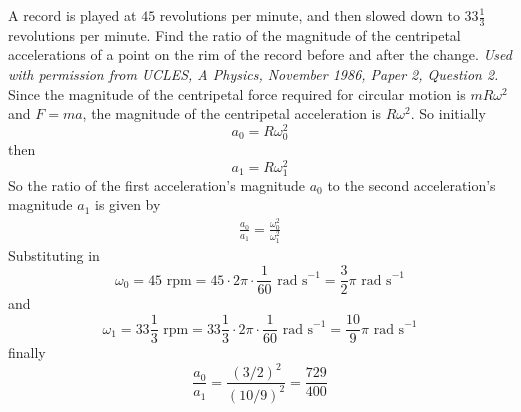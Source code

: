 \begin{problem}
{A record is played at $45$ revolutions per minute, and then slowed down to $33\frac{1}{3}$ revolutions per minute. Find the ratio of the magnitude of the centripetal accelerations of a point on the rim of the record before and after the change. }
{\textit{Used with permission from UCLES, A Physics, November 1986, Paper 2, Question 2.}}
{Since the magnitude of the centripetal force required for circular motion is $mR\omega^2$ and $F=ma$, the magnitude of the centripetal acceleration is $R\omega^2$. So initially
\begin{equation*} a_0=R\omega_0^2 \end{equation*}
then 
\begin{equation*} a_1=R\omega_1^2 \end{equation*}
So the ratio of the first acceleration's magnitude $a_0$ to the second acceleration's magnitude $a_1$ is given by 
\begin{align*} \frac{a_0}{a_1}=\frac{\omega_0^2}{\omega_1^2} \end{align*}
Substituting in 
\begin{equation*}
\omega_0=45\textrm{ rpm}=45\cdot2\pi\cdot\frac{1}{60}\textrm{ rad s}^{-1}=\frac{3}{2}\pi\textrm{ rad s}^{-1}
\end{equation*} and
\begin{equation*}
\omega_1=33\frac{1}{3}\textrm{ rpm}=33\frac{1}{3}\cdot2\pi\cdot\frac{1}{60}\textrm{ rad s}^{-1}=\frac{10}{9}\pi\textrm{ rad s}^{-1}
\end{equation*}
finally
\begin{equation*} \frac{a_0}{a_1}=\frac{(3/2)^2}{(10/9)^2}=\frac{729}{400} \end{equation*}
}
\end{problem}